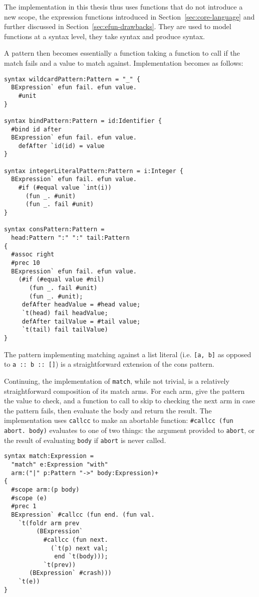 \documentclass{kththesis}
\begin{document}
The implementation in this thesis thus uses functions that do not introduce a new scope, the expression functions introduced in Section~\ref{sec:core-language} and further discussed in Section~\ref{sec:efun-drawbacks}. They are used to model functions at a syntax level, they take syntax and produce syntax.

A pattern then becomes essentially a function taking a function to call if the match fails and a value to match against. Implementation becomes as follows:

\begin{verbatim}
syntax wildcardPattern:Pattern = "_" {
  BExpression` efun fail. efun value.
    #unit
}

syntax bindPattern:Pattern = id:Identifier {
  #bind id after
  BExpression` efun fail. efun value.
    defAfter `id(id) = value
}

syntax integerLiteralPattern:Pattern = i:Integer {
  BExpression` efun fail. efun value.
    #if (#equal value `int(i))
      (fun _. #unit)
      (fun _. fail #unit)
}

syntax consPattern:Pattern =
  head:Pattern ":" ":" tail:Pattern
{
  #assoc right
  #prec 10
  BExpression` efun fail. efun value.
    (#if (#equal value #nil)
       (fun _. fail #unit)
       (fun _. #unit);
     defAfter headValue = #head value;
     `t(head) fail headValue;
     defAfter tailValue = #tail value;
     `t(tail) fail tailValue)
}
\end{verbatim}

The pattern implementing matching against a list literal (i.e. \texttt{[a, b]} as opposed to \texttt{a :: b :: []}) is a straightforward extension of the cons pattern.

Continuing, the implementation of \texttt{match}, while not trivial, is a relatively straightforward composition of its match arms. For each arm, give the pattern the value to check, and a function to call to skip to checking the next arm in case the pattern fails, then evaluate the body and return the result. The implementation uses \texttt{callcc} to make an abortable function: \texttt{#callcc (fun abort. body)} evaluates to one of two things: the argument provided to \texttt{abort}, or the result of evaluating \texttt{body} if \texttt{abort} is never called.

\begin{verbatim}
syntax match:Expression =
  "match" e:Expression "with"
  arm:("|" p:Pattern "->" body:Expression)+
{
  #scope arm:(p body)
  #scope (e)
  #prec 1
  BExpression` #callcc (fun end. (fun val.
    `t(foldr arm prev
         (BExpression`
           #callcc (fun next.
             (`t(p) next val;
              end `t(body)));
           `t(prev))
       (BExpression` #crash)))
    `t(e))
}
\end{verbatim}
\end{document}
